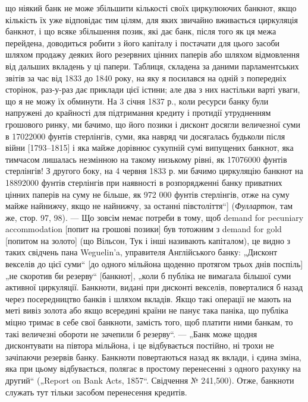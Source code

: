 {що ніякий банк не може збільшити кількості своїх циркулюючих банкнот,
якщо кількість їх уже відповідає тим цілям, для яких звичайно вживається циркуляція
банкнот, і що всяке збільшення позик, які дає банк, після того як ця межа
перейдена, доводиться робити з його капіталу і постачати для цього засоби
шляхом продажу деяких його резервних цінних паперів або шляхом відмовлення
від дальших вкладень у ці папери. Таблиця, складена за даними парламентських
звітів за час від 1833 до 1840 року, на яку я посилався на одній з попередніх
сторінок, раз-у-раз дає приклади цієї істини; але два з них настільки варті уваги,
що я не можу їх обминути. На 3 січня 1837 р., коли ресурси банку були
напружені до крайності для підтримання кредиту і протидії утрудненням
грошового ринку, ми бачимо, що його позики і дисконт досягли величезної
суми в 17022000 фунтів стерлінгів, суми, яка навряд чи досягалась будьколи
після війни [1793--1815] і яка майже дорівнює сукупній сумі випущених
банкнот, яка тимчасом лишалась незмінною на такому низькому рівні,
як 17076000 фунтів стерлінгів! З другого боку, на 4 червня 1833 р. ми бачимо
циркуляцію банкнот на 18892000 фунтів стерлінгів при наявності в розпорядженні
банку приватних цінних паперів на суму не більше, як 972 000 фунтів
стерлінгів, отже на суму майже найнижчу, якщо не найнижчу, за останні
півстоліття“] (\emph{Фуллартон}, там же, стор. 97, 98). — Що зовсім немає потреби
в тому, щоб demand for pecuniary accommodation [попит на грошові позики] був
тотожним з demand for gold [попитом на золото] (що Вільсон, Тук і інші називають
капіталом), це видно з таких свідчень пана Weguelin’a, управителя Англійського
банку: „Дисконт векселів до цієї суми“ [до одного мільйона щоденно
протягом трьох днів поспіль] „не скоротив би резерву“ [банкнот], „коли б публіка
не вимагала більшої суми активної циркуляції. Банкноти, видані при
дисконті векселів, поверталися б назад через посередництво банків і шляхом
вкладів. Якщо такі операції не мають на меті вивіз золота або якщо всередині
країни не панує така паніка, що публіка міцно тримає в себе свої банкноти,
замість того, щоб платити ними банкам, то такі величезні обороти не зачепили б
резерву“. — „Банк може щодня дисконтувати на півтора мільйона, і це відбувається
постійно, ні трохи не зачіпаючи резервів банку. Банкноти повертаються
назад як вклади, і єдина зміна, яка при цьому відбувається, полягає в простому
перенесенні з одного рахунку на другий“ („Report on Bank Acts, 1857“. Свідчення
№ 241,500). Отже, банкноти служать тут тільки засобом перенесення кредитів.
}

